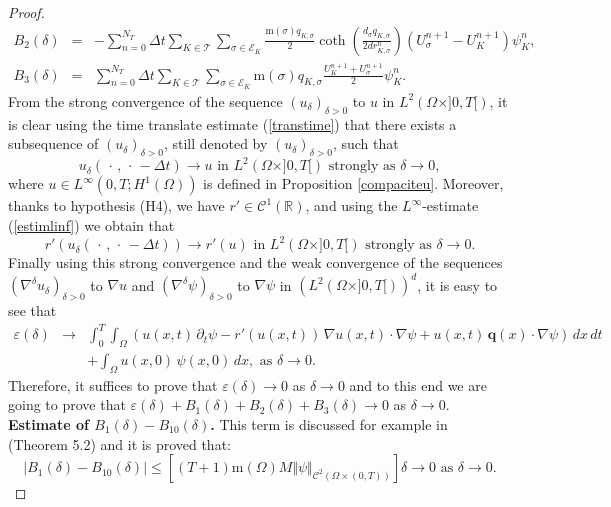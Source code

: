 \documentclass[smallextended]{svjour3}
\def\pa{\partial}
\def\ud{u_{\delta}}
\def\pa{\partial}
\begin{document}
\begin{proof}
\begin{eqnarray*}
B_{2}(\delta) &=& -\sum_{n=0}^{N_{T}}\Delta t \sum_{K \in \mathcal{T}} \sum_{\sigma \in \mathcal{E}_{K}}\frac{\text{m}(\sigma)q_{K,\sigma}}{2}\coth\left(\frac{d_{\sigma}q_{K,\sigma}}{2dr_{K,\sigma}^{n}}\right)\left(U^{n+1}_{\sigma}-U^{n+1}_{K}\right)\psi^{n}_{K},\\
B_{3}(\delta) &=& \sum_{n=0}^{N_{T}}\Delta t \sum_{K \in \mathcal{T}} \sum_{\sigma \in \mathcal{E}_{K}} \text{m}(\sigma)q_{K,\sigma}\frac{U_{K}^{n+1}+U_{\sigma}^{n+1}}{2}\psi^{n}_{K}.
\end{eqnarray*}
From the strong convergence of the sequence $(\ud)_{\delta>0}$ to $u$ in $L^{2}(\Omega \times ]0,T[)$, it is clear using the time translate estimate (\ref{transtime}) that there exists a subsequence of $(\ud)_{\delta>0}$, still denoted by   $(\ud)_{\delta>0}$, such that
\begin{equation*}
\ud( \,\cdot \, ,\, \cdot \,-\Delta t) \longrightarrow u \text{ in } L^{2}(\Omega \times ]0,T[) \text{ strongly as } \delta \rightarrow 0,
\end{equation*}
where $u \in L^{\infty}(0,T;H^{1}(\Omega))$ is defined in Proposition \ref{compaciteu}. Moreover, thanks to hypothesis (H4), we have $r' \in \mathcal{C}^{1}(\mathbb{R})$, and using the $L^{\infty}$-estimate (\ref{estimlinf}) we obtain that
\begin{equation*}
r'(\ud(\,\cdot \, ,\, \cdot \,-\Delta t))\longrightarrow r'(u) \text{ in } L^{2}(\Omega \times ]0,T[) \text{ strongly as } \delta \rightarrow 0.
\end{equation*}
Finally using this strong convergence and the weak convergence of the sequences $(\nabla^{\delta}u_{\delta})_{\delta>0}$ to $\nabla u$ and $(\nabla^{\delta}\psi)_{\delta>0}$ to $\nabla \psi$ in $(L^{2}(\Omega \times ]0,T[))^{d}$, it is easy to see that
\begin{eqnarray*}
\varepsilon(\delta)& \longrightarrow & \int_{0}^{T}\int_{\Omega}\left(u(x,t)\, \pa_{t}\psi-r'(u(x,t))\, \nabla u(x,t) \cdot \nabla \psi+u(x,t) \, \mathbf{q}(x) \cdot \nabla\psi\right) \, dx \, dt\\
& & +\int_{\Omega}u(x,0) \, \psi(x,0)\, dx, \text{ as } \delta \rightarrow 0.
\end{eqnarray*}
Therefore, it suffices to prove that $\varepsilon(\delta) \longrightarrow 0$ as $\delta \rightarrow 0$ and to this end we are going to prove that $\varepsilon(\delta)+B_{1}(\delta)+B_{2}(\delta)+B_{3}(\delta) \longrightarrow 0$ as $\delta \rightarrow 0$.\\

\textbf{Estimate of $B_{1}(\delta)-B_{10}(\delta)$.} This term is discussed for example in \cite{Chainais-Hillairet2003} (Theorem 5.2) and it is proved that:
\begin{equation*}
|B_{1}(\delta)-B_{10}(\delta)| \leq  \left[(T+1)\text{m}(\Omega)M\Vert \psi \Vert_{\mathcal{C}^{2}(\Omega \times (0,T))}\right]\delta \longrightarrow 0 \text{ as } \delta \rightarrow 0.
\end{equation*}


\end{proof}
\end{document}
